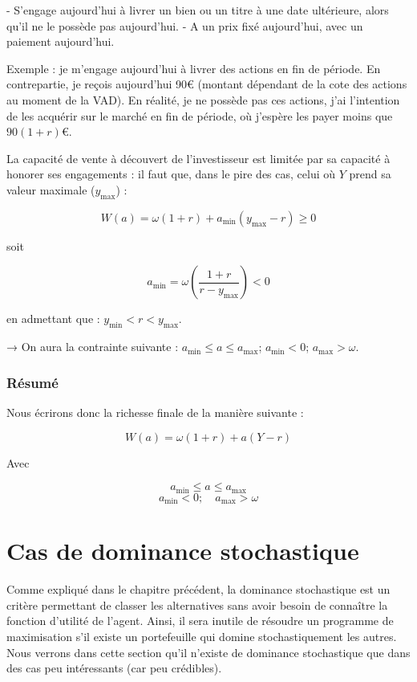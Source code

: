 \documentclass[a4paper, 12pt]{report}
\begin{document}
- S'engage aujourd'hui à livrer un bien ou un titre à une date ultérieure, alors qu'il ne le possède pas aujourd'hui.
- A un prix fixé aujourd'hui, avec un paiement aujourd'hui.

Exemple : je m'engage aujourd'hui à livrer des actions en fin de période. En contrepartie, je reçois aujourd'hui 90€ (montant dépendant de la cote des actions au moment de la VAD). En réalité, je ne possède pas ces actions, j'ai l'intention de les acquérir sur le marché en fin de période, où j'espère les payer moins que \( 90(1 + r) \)€.

La capacité de vente à découvert de l'investisseur est limitée par sa capacité à honorer ses engagements : il faut que, dans le pire des cas, celui où \( Y \) prend sa valeur maximale (\( y_{\text{max}} \)) :

\[
W(a) = \omega (1 + r) + a_{\text{min}} (y_{\text{max}} - r) \geq 0
\]

soit 

\[
a_{\text{min}} =\omega \left( \frac{ 1 + r}{r - y_{\text{max}}}\right)  < 0
\]

en admettant que : \( y_{\text{min}} < r < y_{\text{max}} \).

→ On aura la contrainte suivante : \( a_{\text{min}} \leq a \leq a_{\text{max}} \); \( a_{\text{min}} < 0 \); \( a_{\text{max}} > \omega \).

\subsubsection{Résumé}


Nous écrirons donc la richesse finale de la manière suivante :

\[
W(a) = \omega (1 + r) + a (Y - r)
\]

Avec 

\[
a_{\text{min}} \leq a \leq a_{\text{max}}
\]
\[
a_{\text{min}} < 0 ; \quad a_{\text{max}} > \omega
\]

\section{Cas de dominance stochastique}

Comme expliqué dans le chapitre précédent, la dominance stochastique est un critère permettant de classer les alternatives sans avoir besoin de connaître la fonction d'utilité de l'agent. Ainsi, il sera inutile de résoudre un programme de maximisation s'il existe un portefeuille qui domine stochastiquement les autres. Nous verrons dans cette section qu'il n'existe de dominance stochastique que dans des cas peu intéressants (car peu crédibles).
\end{document}
